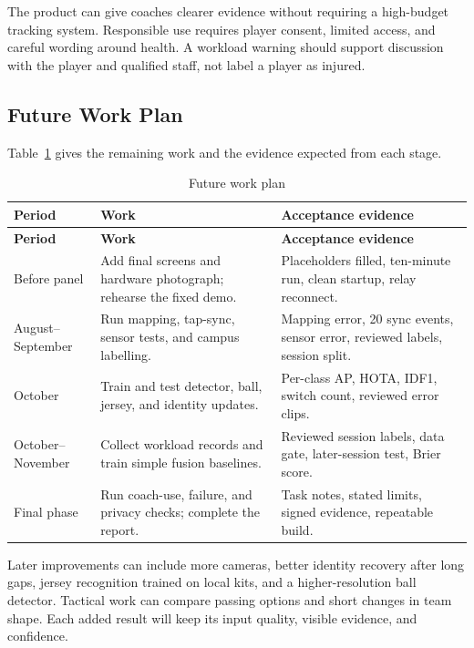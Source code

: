 The product can give coaches clearer evidence without requiring a high-budget
tracking system. Responsible use requires player consent, limited access, and
careful wording around health. A workload warning should support discussion
with the player and qualified staff, not label a player as injured.

\subsection{Future Work Plan}
Table~\ref{tab:future_plan} gives the remaining work and the evidence expected
from each stage.

\begingroup
\small
\begin{longtable}{@{}p{1.0in}p{2.15in}p{2.75in}@{}}
\caption{Future work plan}\label{tab:future_plan}\\
\toprule
\textbf{Period} & \textbf{Work} & \textbf{Acceptance evidence}\\
\midrule
\endfirsthead
\toprule
\textbf{Period} & \textbf{Work} & \textbf{Acceptance evidence}\\
\midrule
\endhead
Before panel & Add final screens and hardware photograph; rehearse the fixed demo. & Placeholders filled, ten-minute run, clean startup, relay reconnect.\\
August--September & Run mapping, tap-sync, sensor tests, and campus labelling. & Mapping error, 20 sync events, sensor error, reviewed labels, session split.\\
October & Train and test detector, ball, jersey, and identity updates. & Per-class AP, HOTA, IDF1, switch count, reviewed error clips.\\
October--November & Collect workload records and train simple fusion baselines. & Reviewed session labels, data gate, later-session test, Brier score.\\
Final phase & Run coach-use, failure, and privacy checks; complete the report. & Task notes, stated limits, signed evidence, repeatable build.\\
\bottomrule
\end{longtable}
\endgroup

Later improvements can include more cameras, better identity recovery after long
gaps, jersey recognition trained on local kits, and a higher-resolution ball
detector. Tactical work can compare passing options and short changes in team
shape. Each added result will keep its input quality, visible evidence, and
confidence.
